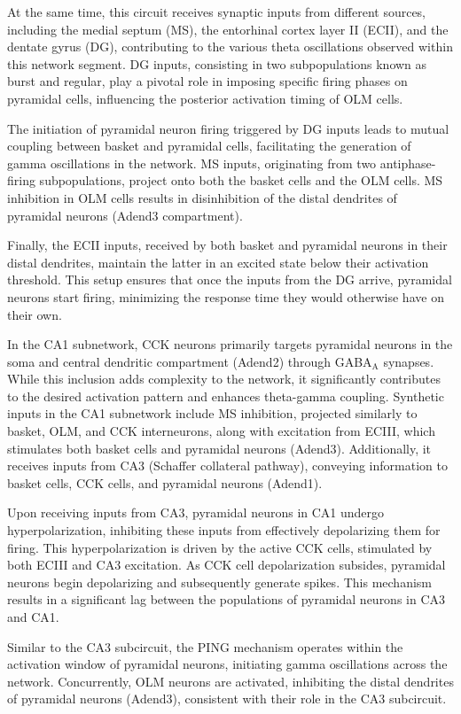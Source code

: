 \documentclass[../main.tex]{subfiles}
\begin{document}
At the same time, this circuit receives synaptic inputs from different sources, including the medial septum (MS), the entorhinal cortex layer II (ECII), and the dentate gyrus (DG), contributing to the various theta oscillations observed within this network segment.
DG inputs, consisting in two subpopulations known as burst and regular, play a pivotal role in imposing specific firing phases on pyramidal cells, influencing the posterior activation timing of OLM cells.

The initiation of pyramidal neuron firing triggered by DG inputs leads to mutual coupling between basket and pyramidal cells, facilitating the generation of gamma oscillations in the network.
MS inputs, originating from two antiphase-firing subpopulations, project onto both the basket cells and the OLM cells.
MS inhibition in OLM cells results in disinhibition of the distal dendrites of pyramidal neurons (Adend3 compartment).

Finally, the ECII inputs, received by both basket and pyramidal neurons in their distal dendrites, maintain the latter in an excited state below their activation threshold.
This setup ensures that once the inputs from the DG arrive, pyramidal neurons start firing, minimizing the response time they would otherwise have on their own.

In the CA1 subnetwork, CCK neurons primarily targets pyramidal neurons in the soma and central dendritic compartment (Adend2) through GABA$_\text{A}$ synapses.
While this inclusion adds complexity to the network, it significantly contributes to the desired activation pattern and enhances theta-gamma coupling.
Synthetic inputs in the CA1 subnetwork include MS inhibition, projected similarly to basket, OLM, and CCK interneurons, along with excitation from ECIII, which stimulates both basket cells and pyramidal neurons (Adend3).
Additionally, it receives inputs from CA3 (Schaffer collateral pathway), conveying information to basket cells, CCK cells, and pyramidal neurons (Adend1).

Upon receiving inputs from CA3, pyramidal neurons in CA1 undergo hyperpolarization, inhibiting these inputs from effectively depolarizing them for firing.
This hyperpolarization is driven by the active CCK cells, stimulated by both ECIII and CA3 excitation.
As CCK cell depolarization subsides, pyramidal neurons begin depolarizing and subsequently generate spikes.
This mechanism results in a significant lag between the populations of pyramidal neurons in CA3 and CA1.

Similar to the CA3 subcircuit, the PING mechanism operates within the activation window of pyramidal neurons, initiating gamma oscillations across the network. Concurrently, OLM neurons are activated, inhibiting the distal dendrites of pyramidal neurons (Adend3), consistent with their role in the CA3 subcircuit.
\end{document}
